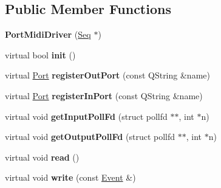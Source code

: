 \subsection*{Public Member Functions}
\begin{DoxyCompactItemize}
\item 
\mbox{\label{class_ms_1_1_port_midi_driver_aca784c1a9670a7c4a870827c0d4ce702}} 
{\bfseries Port\+Midi\+Driver} (\hyperlink{class_ms_1_1_seq}{Seq} $\ast$)
\item 
\mbox{\label{class_ms_1_1_port_midi_driver_a81aaafdffeb5257ed96d62c46c8bfb0d}} 
virtual bool {\bfseries init} ()
\item 
\mbox{\label{class_ms_1_1_port_midi_driver_a055d62a2293dc0af422adfca951a3114}} 
virtual \hyperlink{class_ms_1_1_port}{Port} {\bfseries register\+Out\+Port} (const Q\+String \&name)
\item 
\mbox{\label{class_ms_1_1_port_midi_driver_aee89ff2bcf298a4275a19a1489af1e9d}} 
virtual \hyperlink{class_ms_1_1_port}{Port} {\bfseries register\+In\+Port} (const Q\+String \&name)
\item 
\mbox{\label{class_ms_1_1_port_midi_driver_a52217dccbb75d1e3caef783c3517a0de}} 
virtual void {\bfseries get\+Input\+Poll\+Fd} (struct pollfd $\ast$$\ast$, int $\ast$n)
\item 
\mbox{\label{class_ms_1_1_port_midi_driver_a85a497c870dc6c5745e8d9b5338b3f4a}} 
virtual void {\bfseries get\+Output\+Poll\+Fd} (struct pollfd $\ast$$\ast$, int $\ast$n)
\item 
\mbox{\label{class_ms_1_1_port_midi_driver_a012fb5eb4d200a0606dc104204c9f1bd}} 
virtual void {\bfseries read} ()
\item 
\mbox{\label{class_ms_1_1_port_midi_driver_aed1df5c9b058a4963ef3bb90b0524b80}} 
virtual void {\bfseries write} (const \hyperlink{class_ms_1_1_event}{Event} \&)
\item 
\mbox{\label{class_ms_1_1_port_midi_driver_abc8ca25c4246027d6bd91a73cb604aa8}} 

\end{DoxyCompactItemize}
